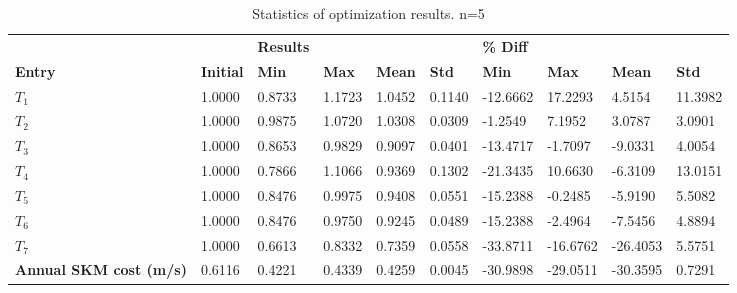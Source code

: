 \begin{table}[H]
\centering
\begin{tabular}{llllllllll}
\textbf{} & \textbf{} & \cellcolor[HTML]{EFEFEF}\textbf{Results} & \cellcolor[HTML]{EFEFEF} & \cellcolor[HTML]{EFEFEF} & \cellcolor[HTML]{EFEFEF} & \cellcolor[HTML]{EFEFEF}\textbf{\% Diff} & \cellcolor[HTML]{EFEFEF} & \cellcolor[HTML]{EFEFEF} & \cellcolor[HTML]{EFEFEF} \\
\rowcolor[HTML]{EFEFEF} 
\textbf{Entry} & \textbf{Initial} & \textbf{Min} & \textbf{Max} & \textbf{Mean} & \textbf{Std} & \textbf{Min} & \textbf{Max} & \textbf{Mean} & \textbf{Std} \\
$T_{1}$ & 1.0000 & 0.8733 & 1.1723 & 1.0452 & 0.1140 & -12.6662 & 17.2293 & 4.5154 & 11.3982 \\ 
$T_{2}$ & 1.0000 & 0.9875 & 1.0720 & 1.0308 & 0.0309 & -1.2549 & 7.1952 & 3.0787 & 3.0901 \\ 
$T_{3}$ & 1.0000 & 0.8653 & 0.9829 & 0.9097 & 0.0401 & -13.4717 & -1.7097 & -9.0331 & 4.0054 \\ 
$T_{4}$ & 1.0000 & 0.7866 & 1.1066 & 0.9369 & 0.1302 & -21.3435 & 10.6630 & -6.3109 & 13.0151 \\ 
$T_{5}$ & 1.0000 & 0.8476 & 0.9975 & 0.9408 & 0.0551 & -15.2388 & -0.2485 & -5.9190 & 5.5082 \\ 
$T_{6}$ & 1.0000 & 0.8476 & 0.9750 & 0.9245 & 0.0489 & -15.2388 & -2.4964 & -7.5456 & 4.8894 \\ 
$T_{7}$ & 1.0000 & 0.6613 & 0.8332 & 0.7359 & 0.0558 & -33.8711 & -16.6762 & -26.4053 & 5.5751 \\ 
\rowcolor[HTML]{EFEFEF} 
\textbf{Annual SKM cost (m/s)} & 0.6116 & 0.4221 & 0.4339 & 0.4259 & 0.0045 & -30.9898 & -29.0511 & -30.3595 & 0.7291 \\ 
\end{tabular}
\caption{Statistics of optimization results. n=5}
\label{tab:StatisticsOptimizationAnalysis}
\end{table}